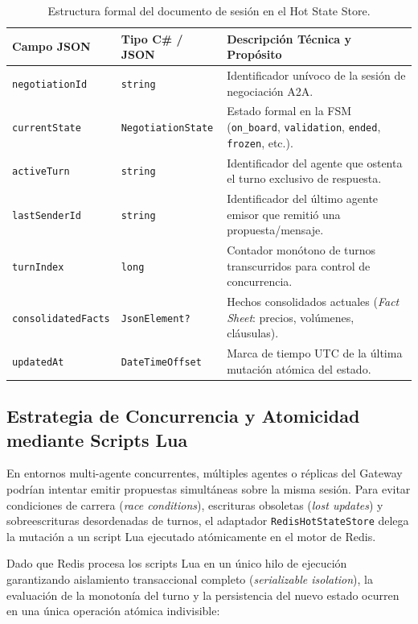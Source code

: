 \begin{table}[htbp]
\centering
\small
\begin{tabular}{@{}llp{8.5cm}@{}}
\toprule
\textbf{Campo JSON} & \textbf{Tipo C\# / JSON} & \textbf{Descripción Técnica y Propósito} \\ \midrule
\texttt{negotiationId} & \texttt{string} & Identificador unívoco de la sesión de negociación A2A. \\
\texttt{currentState}  & \texttt{NegotiationState} & Estado formal en la FSM (\texttt{on\_board}, \texttt{validation}, \texttt{ended}, \texttt{frozen}, etc.). \\
\texttt{activeTurn}    & \texttt{string} & Identificador del agente que ostenta el turno exclusivo de respuesta. \\
\texttt{lastSenderId}  & \texttt{string} & Identificador del último agente emisor que remitió una propuesta/mensaje. \\
\texttt{turnIndex}     & \texttt{long} & Contador monótono de turnos transcurridos para control de concurrencia. \\
\texttt{consolidatedFacts} & \texttt{JsonElement?} & Hechos consolidados actuales (\textit{Fact Sheet}: precios, volúmenes, cláusulas). \\
\texttt{updatedAt}     & \texttt{DateTimeOffset} & Marca de tiempo UTC de la última mutación atómica del estado. \\ \bottomrule
\end{tabular}
\caption{Estructura formal del documento de sesión en el Hot State Store.}
\label{tab:hot_state_schema}
\end{table}

\subsection{Estrategia de Concurrencia y Atomicidad mediante Scripts Lua}
En entornos multi-agente concurrentes, múltiples agentes o réplicas del Gateway podrían intentar emitir propuestas simultáneas sobre la misma sesión. Para evitar condiciones de carrera (\textit{race conditions}), escrituras obsoletas (\textit{lost updates}) y sobreescrituras desordenadas de turnos, el adaptador \texttt{RedisHotStateStore} delega la mutación a un script Lua ejecutado atómicamente en el motor de Redis.

Dado que Redis procesa los scripts Lua en un único hilo de ejecución garantizando aislamiento transaccional completo (\textit{serializable isolation}), la evaluación de la monotonía del turno y la persistencia del nuevo estado ocurren en una única operación atómica indivisible:

